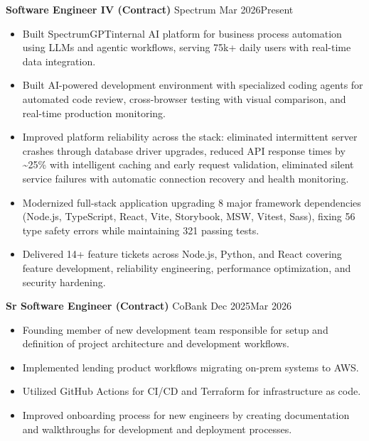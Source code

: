 \documentclass[11pt,letterpaper]{article}
\begin{document}
\textbf{Software Engineer IV (Contract)} \hfill Spectrum \hfill Mar 2026\textendash{}Present
\begin{itemize}
  \item Built SpectrumGPT\textemdash{}internal AI platform for business process automation using LLMs and agentic workflows, serving 75k+ daily users with real-time data integration.
  \item Built AI-powered development environment with specialized coding agents for automated code review, cross-browser testing with visual comparison, and real-time production monitoring.
  \item Improved platform reliability across the stack: eliminated intermittent server crashes through database driver upgrades, reduced API response times by \textasciitilde25\% with intelligent caching and early request validation, eliminated silent service failures with automatic connection recovery and health monitoring.
  \item Modernized full-stack application upgrading 8 major framework dependencies (Node.js, TypeScript, React, Vite, Storybook, MSW, Vitest, Sass), fixing 56 type safety errors while maintaining 321 passing tests.
  \item Delivered 14+ feature tickets across Node.js, Python, and React covering feature development, reliability engineering, performance optimization, and security hardening.
\end{itemize}

\textbf{Sr Software Engineer (Contract)} \hfill CoBank \hfill Dec 2025\textendash{}Mar 2026
\begin{itemize}
  \item Founding member of new development team responsible for setup and definition of project architecture and development workflows.
  \item Implemented lending product workflows migrating on-prem systems to AWS.
  \item Utilized GitHub Actions for CI/CD and Terraform for infrastructure as code.
  \item Improved onboarding process for new engineers by creating documentation and walkthroughs for development and deployment processes.
\end{itemize}
\end{document}
